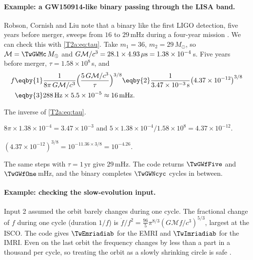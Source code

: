 \paragraph{Example: a GW150914-like binary passing through the LISA band.}
Robson, Cornish and Liu note that a binary like the first LIGO detection, five years before merger, sweeps from $16$ to $29$\,mHz during a four-year mission \cite[Sec.~2]{Robson2019}. We can check this with \eqref{T2a:eq:tau}. Take $m_1=36$, $m_2=29\,M_\odot$, so $\mathcal M=\TwGWMc\,M_\odot$ and $G\mathcal M/c^3=28.1\times4.93\,\mu{\rm s}=1.38\times10^{-4}$\,s. Five years before merger, $\tau=1.58\times10^8$\,s, and
\begin{align*}
  f&\eqby{1}\frac{1}{8\pi\,G\mathcal M/c^3}\Big(\frac{5\,G\mathcal M/c^3}{\tau}\Big)^{3/8}
  \eqby{2}\frac{1}{3.47\times10^{-3}\,{\rm s}}\big(4.37\times10^{-12}\big)^{3/8}\\
  &\eqby{3}288\,{\rm Hz}\times5.5\times10^{-5}\approx16\,{\rm mHz}.
\end{align*}
\begin{explain}
  \item The inverse of \eqref{T2a:eq:tau}.
  \item $8\pi\times1.38\times10^{-4}=3.47\times10^{-3}$ and $5\times1.38\times10^{-4}/1.58\times10^8=4.37\times10^{-12}$.
  \item $(4.37\times10^{-12})^{3/8}=10^{-11.36\times3/8}=10^{-4.26}$.
\end{explain}
The same steps with $\tau=1$\,yr give $29$\,mHz. The code returns $\TwGWfFive$ and $\TwGWfOne$\,mHz, and the binary completes $\TwGWNcyc$ cycles in between.

\paragraph{Example: checking the slow-evolution input.}
Input 2 assumed the orbit barely changes during one cycle. The fractional change of $f$ during one cycle (duration $1/f$) is $\dot f/f^2=\frac{96}{5}\pi^{8/3}(G\mathcal Mf/c^3)^{5/3}$, largest at the ISCO. The code gives $\TwEmriadiab$ for the EMRI and $\TwImriadiab$ for the IMRI. Even on the last orbit the frequency changes by less than a part in a thousand per cycle, so treating the orbit as a slowly shrinking circle is safe \cite[eq.~(25)]{CutlerFlanagan1994}.

